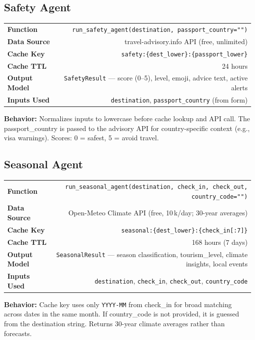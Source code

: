 \documentclass[11pt,a4paper]{article}
\begin{document}
\subsection{Safety Agent}
\begin{infobox}
{\small
\begin{tabularx}{\textwidth}{@{}L{3cm}R@{}}
\textbf{Function}     & \texttt{run\_safety\_agent(destination, passport\_country="")} \\[3pt]
\textbf{Data Source}   & travel-advisory.info API (free, unlimited) \\[3pt]
\textbf{Cache Key}     & \texttt{safety:\{dest\_lower\}:\{passport\_lower\}} \\[3pt]
\textbf{Cache TTL}     & 24 hours \\[3pt]
\textbf{Output Model}  & \texttt{SafetyResult} --- score (0--5), level, emoji, advice text, active alerts \\[3pt]
\textbf{Inputs Used}   & \texttt{destination}, \texttt{passport\_country} (from form) \\
\end{tabularx}}

\textbf{Behavior:} Normalizes inputs to lowercase before cache lookup and API call. The passport\_country is passed to the advisory API for country-specific context (e.g., visa warnings). Scores: 0 = safest, 5 = avoid travel.
\end{infobox}

\subsection{Seasonal Agent}
\begin{infobox}
{\small
\begin{tabularx}{\textwidth}{@{}L{3cm}R@{}}
\textbf{Function}     & \texttt{run\_seasonal\_agent(destination, check\_in, check\_out, country\_code="")} \\[3pt]
\textbf{Data Source}   & Open-Meteo Climate API (free, 10\,k/day; 30-year averages) \\[3pt]
\textbf{Cache Key}     & \texttt{seasonal:\{dest\_lower\}:\{check\_in[:7]\}} \\[3pt]
\textbf{Cache TTL}     & 168 hours (7 days) \\[3pt]
\textbf{Output Model}  & \texttt{SeasonalResult} --- season classification, tourism\_level, climate insights, local events \\[3pt]
\textbf{Inputs Used}   & \texttt{destination}, \texttt{check\_in}, \texttt{check\_out}, \texttt{country\_code} \\
\end{tabularx}}

\textbf{Behavior:} Cache key uses only \texttt{YYYY-MM} from check\_in for broad matching across dates in the same month. If country\_code is not provided, it is guessed from the destination string. Returns 30-year climate averages rather than forecasts.
\end{infobox}
\end{document}

